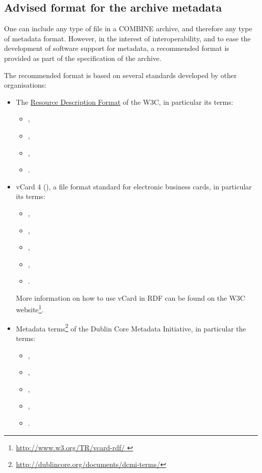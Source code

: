 \subsection{Advised format for the archive metadata}

One can include any type of file in a COMBINE archive, and therefore any 
type of metadata format. However, in the interest of interoperability, 
and to ease the development of software support for metadata, a 
recommended format is provided as part of the specification of the 
archive. 

The recommended format is based on several standards developed by other 
organisations: 

\begin{itemize}
	\item  {
	
     The \href{http://www.w3.org/RDF/ }{ Resource Description Format} of the 
     W3C, in particular its terms:
     \begin{itemize}
		\item {}, 
		\item {}, 
		\item {}, 
		\item {}.
	\end{itemize}
	}
	\item  {

	vCard 4 (\cite{rfc6350}), a file format standard for electronic business 
    cards, in particular its terms:
    	\begin{itemize}
		\item {}, 
		\item {}, 
		\item {}, 
		\item {},
		\item {}.
	\end{itemize}

	More information on how to use vCard in RDF can be found 
    on the W3C website\footnote[1]{\url{http://www.w3.org/TR/vcard-rdf/ }}.
	
	}
	\item {
	
	Metadata terms\footnote[2]{\url{http://dublincore.org/documents/dcmi-terms/}} of 
	the Dublin Core Metadata Initiative, in particular the terms: 

	\begin{itemize}
		\item {}, 
		\item {}, 
		\item {}, 
		\item {},
		\item {}.
	\end{itemize}
		
}
\end{itemize}
